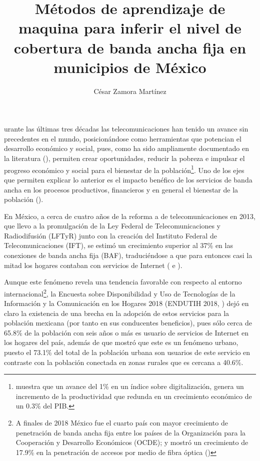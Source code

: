\documentclass[9pt,twocolumn,twoside]{ilcss}
\title{M\'etodos de aprendizaje de maquina para inferir el nivel de cobertura de banda ancha fija en municipios  de México}
\author[a]{C\'esar Zamora Mart\'inez}
\affil[a]{Alumno de Maestría en Ciencias de Datos (ITAM)}
\begin{document}
\maketitle
\thispagestyle{firststyle}


urante las últimas tres décadas las telecomunicaciones han tenido un avance sin precedentes en el mundo, posicionándose como herramientas que potencian el desarrollo económico y social, pues, como ha sido ampliamente documentado en la literatura (\cite{PRADHAN2014634}), permiten crear oportunidades, reducir la pobreza e impulsar el progreso económico y social para el bienestar de la población\footnote{\cite{Katz2018} muestra que un avance del 1\% en un índice sobre digitalización, genera un incremento de la productividad que redunda en un crecimiento económico de un 0.3\% del PIB. }. Uno de los ejes que permiten explicar lo anterior es el impacto benéfico de los servicios de banda ancha en los procesos productivos, financieros y en general el bienestar de la población (\cite{Katz2012}).

En México, a cerca de cuatro años de la reforma a de telecomunicaciones en 2013, que llevo a la promulgación de la Ley Federal de Telecomunicaciones y Radiodifusión (LFTyR) junto con la creación del Instituto Federal de Telecomunicaciones (IFT), se estimó un crecimiento superior al 37\% en las conexiones de banda ancha fija (BAF), traduciéndose a que para entonces casi la mitad los hogares contaban con servicios de Internet (\cite{IFT2017} e \cite{IFT2018}).

Aunque este fenómeno revela una tendencia favorable con respecto al entorno internacional\footnote{A finales de 2018 México fue el cuarto país con mayor crecimiento de penetración de banda ancha fija entre los países de la Organización para la Cooperación y Desarrollo Económicos (OCDE); y mostró un crecimiento de 17.9\% en la penetración de accesos por medio de fibra óptica (\cite{IFT2019})}, la Encuesta sobre Disponibilidad y Uso de Tecnologías de la Información y la Comunicación en los Hogares 2018 (ENDUTIH 2018, \cite{ENDUTIH2018}) dejó en claro la existencia de una brecha en la adopción de estos servicios para la población mexicana (por tanto en sus conducentes beneficios), pues sólo cerca de 65.8\% de la población con seis años o más es usuario de servicios de Internet en los hogares del país, además de que mostró que este es un fenómeno urbano, puesto el 73.1\% del total de la población urbana son usuarios de este servicio en contraste con la población conectada en zonas rurales que es cercana a 40.6\%.
\end{document}
